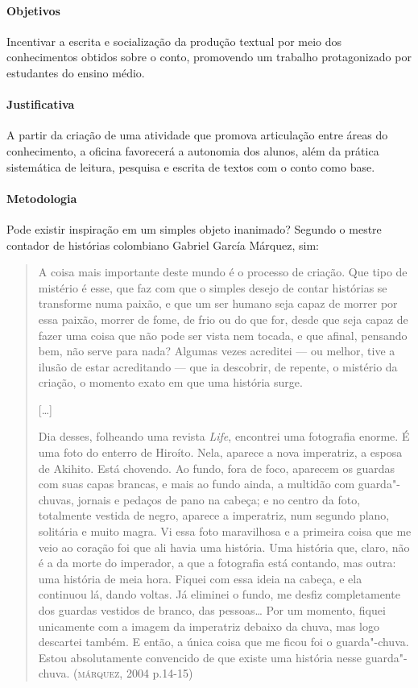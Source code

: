 \documentclass[11pt]{extarticle}
\begin{document}
\paragraph{Objetivos}
Incentivar a escrita e socialização da produção textual por meio dos
conhecimentos obtidos sobre o conto, promovendo um trabalho
protagonizado por estudantes do ensino médio.

\paragraph{Justificativa}
A partir da criação de uma atividade que promova articulação entre áreas
do conhecimento, a oficina favorecerá a autonomia dos alunos, além da
prática sistemática de leitura, pesquisa e escrita de textos com o conto
como base.

\paragraph{Metodologia}
Pode existir inspiração em um simples objeto inanimado? Segundo o mestre
contador de histórias colombiano Gabriel García Márquez, sim:

\begin{quote}
A coisa mais importante deste mundo é o processo de criação. Que tipo de
mistério é esse, que faz com que o simples desejo de contar histórias se
transforme numa paixão, e que um ser humano seja capaz de morrer por
essa paixão, morrer de fome, de frio ou do que for, desde que seja capaz
de fazer uma coisa que não pode ser vista nem tocada, e que afinal,
pensando bem, não serve para nada? Algumas vezes acreditei --- ou
melhor, tive a ilusão de estar acreditando --- que ia descobrir, de
repente, o mistério da criação, o momento exato em que uma história
surge.

{[}\ldots{}{]}

Dia desses, folheando uma revista \emph{Life}, encontrei uma fotografia
enorme. É uma foto do enterro de Hiroíto. Nela, aparece a nova
imperatriz, a esposa de Akihito. Está chovendo. Ao fundo, fora de foco,
aparecem os guardas com suas capas brancas, e mais ao fundo ainda, a
multidão com guarda"-chuvas, jornais e pedaços de pano na cabeça; e no
centro da foto, totalmente vestida de negro, aparece a imperatriz, num
segundo plano, solitária e muito magra. Vi essa foto maravilhosa e a
primeira coisa que me veio ao coração foi que ali havia uma história.
Uma história que, claro, não é a da morte do imperador, a que a
fotografia está contando, mas outra: uma história de meia hora. Fiquei
com essa ideia na cabeça, e ela continuou lá, dando voltas. Já eliminei
o fundo, me desfiz completamente dos guardas vestidos de branco, das
pessoas\ldots{} Por um momento, fiquei unicamente com a imagem da imperatriz
debaixo da chuva, mas logo descartei também. E então, a única coisa que
me ficou foi o guarda"-chuva. Estou absolutamente convencido de que
existe uma história nesse guarda"-chuva. (\textsc{márquez}, 2004 p.14-15)
\end{quote}
\end{document}

